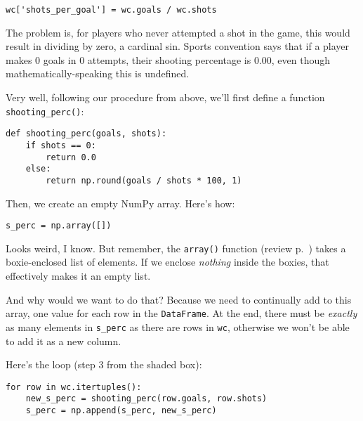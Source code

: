 \begin{Verbatim}[fontsize=\small,samepage=true,frame=single,framesep=3mm]
wc['shots_per_goal'] = wc.goals / wc.shots
\end{Verbatim}


The problem is, for players who never attempted a shot in the game, this would
result in dividing by zero, a cardinal sin. Sports convention says that if a
player makes 0 goals in 0 attempts, their shooting percentage is 0.00, even
though mathematically-speaking this is undefined.

Very well, following our procedure from above, we'll first define a function
\texttt{shooting\_perc()}:

\begin{Verbatim}[fontsize=\small,samepage=true,frame=single,framesep=3mm]
def shooting_perc(goals, shots):
    if shots == 0:
        return 0.0
    else:
        return np.round(goals / shots * 100, 1)
\end{Verbatim}

Then, we create an empty NumPy array. Here's how:

\begin{Verbatim}[fontsize=\small,samepage=true,frame=single,framesep=3mm]
s_perc = np.array([])
\end{Verbatim}

Looks weird, I know. But remember, the \texttt{array()} function (review
p.~\pageref{arrayFunction}) takes a boxie-enclosed list of elements. If we
enclose \textit{nothing} inside the boxies, that effectively makes it an empty
list.

And why would we want to do that? Because we need to continually add to this
array, one value for each row in the \texttt{DataFrame}. At the end, there must
be \textit{exactly} as many elements in \texttt{s\_perc} as there are rows in
\texttt{wc}, otherwise we won't be able to add it as a new column.

Here's the loop (step 3 from the shaded box):

\begin{Verbatim}[fontsize=\small,samepage=true,frame=single,framesep=3mm]
for row in wc.itertuples():
    new_s_perc = shooting_perc(row.goals, row.shots)
    s_perc = np.append(s_perc, new_s_perc)
\end{Verbatim}

